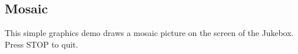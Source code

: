 \subsection{Mosaic}

This simple graphics demo draws a mosaic picture on the screen of the
Jukebox.  Press STOP to quit.
